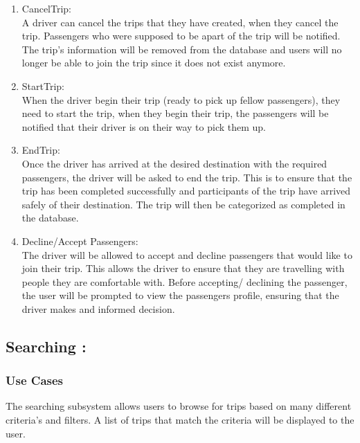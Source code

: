 \documentclass[hidelinks, 12pt, a4paper]{article}
\begin{document}
\begin{enumerate}[label=U1.\arabic*]
                \item CancelTrip:\\
                A driver can cancel the trips that they have created, when they cancel the trip. Passengers who were supposed to be apart of the trip will be notified. The trip’s information will be removed from the database and users will no longer be able to join the trip since it does not exist anymore.\\
                	
                \item StartTrip: \\
                When the driver begin their trip (ready to pick up fellow passengers), they need to start the trip, when they begin their trip, the passengers will be notified that their driver is on their way to pick them up.\\
                
                \item EndTrip:\\
                Once the driver has arrived at the desired destination with the required passengers, the driver will be asked to end the trip. This is to ensure that the trip has been completed successfully and participants of the trip have arrived safely of their destination. The trip will then be categorized  as completed in the database.\\

                \item Decline/Accept Passengers:\\
                The driver will be allowed to accept and decline passengers that would like to join their trip. This allows the driver to ensure that they are travelling with people they are comfortable with. Before accepting/ declining the passenger, the user will be prompted to view the passengers profile, ensuring that the driver makes and informed decision.\\
                	
            \end{enumerate}

\newpage
                \subsection{Searching :}
                \subsubsection{Use Cases}
                The searching subsystem allows users to browse for trips based on many different criteria’s and filters. A list of trips that match the criteria will be displayed to the user.
                    
\end{document}
